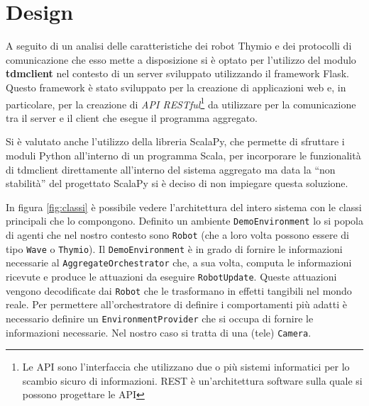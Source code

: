 \documentclass[12pt,a4paper,openright,twoside]{book}
\begin{document}
\chapter{Design}
\label{chap:design}

A seguito di un analisi delle caratteristiche dei robot Thymio e dei protocolli di comunicazione che esso mette a disposizione si è optato per l'utilizzo del modulo \textbf{tdmclient} nel contesto di un server sviluppato utilizzando il framework Flask. Questo framework è stato sviluppato per la creazione di applicazioni web e, in particolare, per la creazione di \textit{API RESTful}\footnote{Le API sono l'interfaccia che utilizzano due o più sistemi informatici per lo scambio sicuro di informazioni. REST è un'architettura software sulla quale si possono progettare le API} da utilizzare per la comunicazione tra il server e il client che esegue il programma aggregato. 

Si è valutato anche l'utilizzo della libreria ScalaPy, che permette di sfruttare i moduli Python all'interno di un programma Scala, per incorporare le funzionalità di tdmclient direttamente all'interno del sistema aggregato ma data la ``non stabilità'' del progettato ScalaPy si è deciso di non impiegare questa soluzione.

In figura \cref{fig:classi} è possibile vedere l'architettura del intero sistema con le classi principali che lo compongono. Definito un ambiente \verb|DemoEnvironment| lo si popola di agenti che nel nostro contesto sono \verb|Robot| (che a loro volta possono essere di tipo \verb|Wave| o \verb|Thymio|). Il \verb|DemoEnvironment| è in grado di fornire le informazioni necessarie al \verb|AggregateOrchestrator| che, a sua volta, computa le informazioni ricevute e produce le attuazioni da eseguire \verb|RobotUpdate|. Queste attuazioni vengono decodificate dai \verb|Robot| che le trasformano in effetti tangibili nel mondo reale. Per permettere all'orchestratore di definire i comportamenti più adatti è necessario definire un \verb|EnvironmentProvider| che si occupa di fornire le informazioni necessarie. Nel nostro caso si tratta di una (tele) \verb|Camera|.
\end{document}
